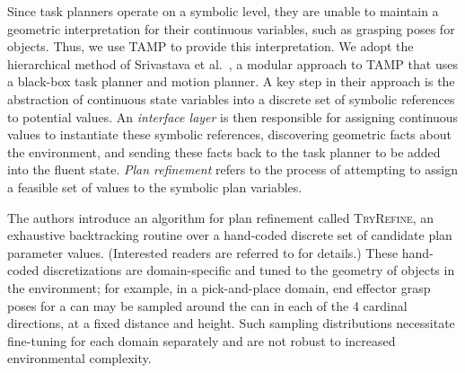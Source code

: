 
Since task planners operate on a symbolic level,
they are unable to maintain a geometric interpretation for their continuous variables, such
as grasping poses for objects. Thus, we use TAMP to provide this interpretation. We adopt the hierarchical method of
Srivastava et al.~\cite{srivastava2014combined}, a modular approach to TAMP
that uses a black-box task planner and motion planner. A key step in their approach is the
abstraction of continuous state variables into a discrete set of symbolic references to
potential values. An \emph{interface layer} is then responsible
for assigning continuous values to instantiate these symbolic references, discovering geometric facts about
the environment, and sending these facts back to the task planner to be added into the fluent state.
\emph{Plan refinement} refers to the process of attempting to assign a feasible set of
values to the symbolic plan variables.

The authors introduce an algorithm for plan refinement
called \textsc{TryRefine}, an exhaustive backtracking routine over a hand-coded discrete set of candidate
plan parameter values. (Interested readers are referred to \cite{srivastava2014combined} for details.)
These hand-coded discretizations are domain-specific and tuned to the geometry of objects in the
environment; for example, in a pick-and-place domain, end effector grasp poses for a can may be
sampled around the can in each of the 4 cardinal directions, at a fixed distance and height.
Such sampling distributions necessitate fine-tuning for each domain separately and are not robust to
increased environmental complexity.

